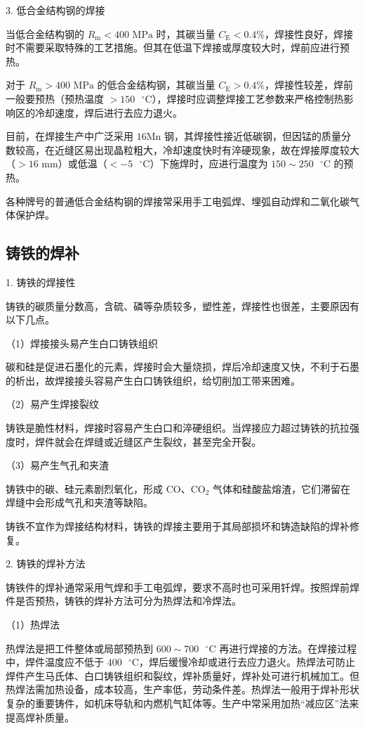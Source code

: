 \documentclass[UTF8]{ctexbook}
\newcommand{\◎}{\ensuremath{\bigcirc}}
\begin{document}
3. 低合金结构钢的焊接

当低合金结构钢的 $R_{\text{m}} < 400\text{ MPa}$ 时，其碳当量 $C_{\text{E}} < 0.4\%$，焊接性良好，焊接时不需要采取特殊的工艺措施。但其在低温下焊接或厚度较大时，焊前应进行预热。

对于 $R_{\text{m}} > 400\text{ MPa}$ 的低合金结构钢，其碳当量 $C_{\text{E}} > 0.4\%$，焊接性较差，焊前一般要预热（预热温度 $> 150\text{ }^\circ\text{C}$），焊接时应调整焊接工艺参数来严格控制热影响区的冷却速度，焊后进行去应力退火。

目前，在焊接生产中广泛采用 $16\text{Mn}$ 钢，其焊接性接近低碳钢，但因锰的质量分数较高，在近缝区易出现晶粒粗大，冷却速度快时有淬硬现象，故在焊接厚度较大（$> 16\text{ mm}$）或低温（$< -5\text{ }^\circ\text{C}$）下施焊时，应进行温度为 $150\sim250\text{ }^\circ\text{C}$ 的预热。

各种牌号的普通低合金结构钢的焊接常采用手工电弧焊、埋弧自动焊和二氧化碳气体保护焊。

\subsection{铸铁的焊补}

1. 铸铁的焊接性

铸铁的碳质量分数高，含硫、磷等杂质较多，塑性差，焊接性也很差，主要原因有以下几点。

（1）焊接接头易产生白口铸铁组织

碳和硅是促进石墨化的元素，焊接时会大量烧损，焊后冷却速度又快，不利于石墨的析出，故焊接接头容易产生白口铸铁组织，给切削加工带来困难。

（2）易产生焊接裂纹

铸铁是脆性材料，焊接时容易产生白口和淬硬组织。当焊接应力超过铸铁的抗拉强度时，焊件就会在焊缝或近缝区产生裂纹，甚至完全开裂。

（3）易产生气孔和夹渣

铸铁中的碳、硅元素剧烈氧化，形成 $\text{CO}$、$\text{CO}_2$ 气体和硅酸盐熔渣，它们滞留在焊缝中会形成气孔和夹渣等缺陷。

铸铁不宜作为焊接结构材料，铸铁的焊接主要用于其局部损坏和铸造缺陷的焊补修复。

2. 铸铁的焊补方法

铸铁件的焊补通常采用气焊和手工电弧焊，要求不高时也可采用钎焊。按照焊前焊件是否预热，铸铁的焊补方法可分为热焊法和冷焊法。

（1）热焊法

热焊法是把工件整体或局部预热到 $600\sim700\text{ }^\circ\text{C}$ 再进行焊接的方法。在焊接过程中，焊件温度应不低于 $400\text{ }^\circ\text{C}$，焊后缓慢冷却或进行去应力退火。热焊法可防止焊件产生马氏体、白口铸铁组织和裂纹，焊补质量好，焊补处可进行机械加工。但热焊法需加热设备，成本较高，生产率低，劳动条件差。热焊法一般用于焊补形状复杂的重要铸件，如机床导轨和内燃机气缸体等。生产中常采用加热“减应区”法来提高焊补质量。
\end{document}

